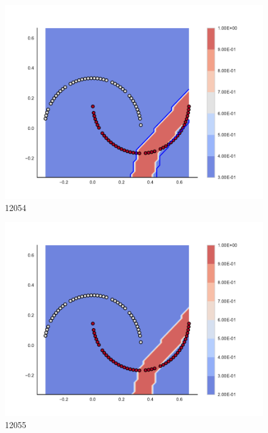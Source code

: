 \begin{subfigure}[b]{0.09\textwidth}
    \includegraphics[clip, trim=2.35cm 1.75cm 4.5cm 0cm,width=\textwidth]{img/convergence/12054.pdf}
    \caption{12054}
    \label{fig:convergence_12054}
\end{subfigure}
%
\begin{subfigure}[b]{0.09\textwidth}
    \includegraphics[clip, trim=2.35cm 1.75cm 4.5cm 0cm,width=\textwidth]{img/convergence/12055.pdf}
    \caption{12055}
    \label{fig:convergence_12055}
\end{subfigure}
%
